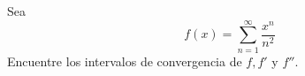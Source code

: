 \item Sea
    \[ f(x) = \sum_{n=1}^\infty \frac{x^n}{n^2} \]
    Encuentre los intervalos de convergencia de $f, f'$ y $f''$.
